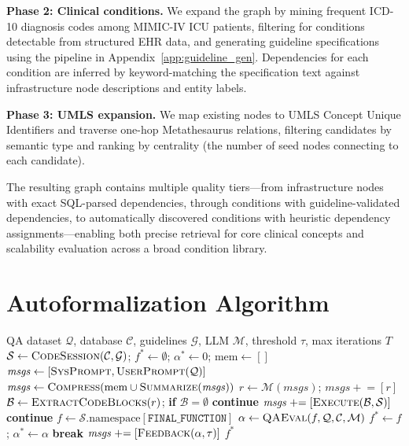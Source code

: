 \textbf{Phase 2: Clinical conditions.} We expand the graph by mining frequent ICD-10 diagnosis codes among MIMIC-IV ICU patients, filtering for conditions detectable from structured EHR data, and generating guideline specifications using the pipeline in Appendix~\ref{app:guideline_gen}. Dependencies for each condition are inferred by keyword-matching the specification text against infrastructure node descriptions and entity labels.

\textbf{Phase 3: UMLS expansion.} We map existing nodes to UMLS Concept Unique Identifiers and traverse one-hop Metathesaurus relations, filtering candidates by semantic type and ranking by centrality (the number of seed nodes connecting to each candidate).

The resulting graph contains multiple quality tiers—from infrastructure nodes with exact SQL-parsed dependencies, through conditions with guideline-validated dependencies, to automatically discovered conditions with heuristic dependency assignments—enabling both precise retrieval for core clinical concepts and scalability evaluation across a broad condition library.


\section{Autoformalization Algorithm}
\label{app:algorithm}

\begin{algorithm}[t]
\caption{Autoformalize}
\label{alg:autoformalize}
\begin{algorithmic}[1]
\Require QA dataset $\mathcal{Q}$, database $\mathcal{C}$, guidelines $\mathcal{G}$, LLM $\mathcal{M}$, threshold $\tau$, max iterations $T$
\State $\mathcal{S} \leftarrow \textsc{CodeSession}(\mathcal{C}, \mathcal{G})$; \;
       $f^* \leftarrow \emptyset$; \; $\alpha^* \leftarrow 0$; \; $\text{mem} \leftarrow []$
\State $\mathit{msgs} \leftarrow [\textsc{SysPrompt}, \textsc{UserPrompt}(\mathcal{Q})]$
        \State $\mathit{msgs} \leftarrow \textsc{Compress}(\text{mem} \cup \textsc{Summarize}(\mathit{msgs}))$
    \EndIf
    \State $r \leftarrow \mathcal{M}(\mathit{msgs})$; \; $\mathit{msgs} \mathrel{+}= [r]$
    \State $\mathcal{B} \leftarrow \textsc{ExtractCodeBlocks}(r)$; \; \textbf{if} $\mathcal{B}=\emptyset$ \textbf{continue}
    \State $\mathit{msgs} \mathrel{+}= [\textsc{Execute}(\mathcal{B}, \mathcal{S})]$
     \textbf{continue} \EndIf
    \State $f \leftarrow \mathcal{S}.\text{namespace}[\texttt{FINAL\_FUNCTION}]$
    \State $\alpha \leftarrow \textsc{QAEval}(f, \mathcal{Q}, \mathcal{C}, \mathcal{M})$
    \If{$\alpha > \alpha^*$} \; $f^* \leftarrow f$; \; $\alpha^* \leftarrow \alpha$ \EndIf
    \If{$\alpha \geq \tau$} \textbf{break} \EndIf
    \State $\mathit{msgs} \mathrel{+}= [\textsc{Feedback}(\alpha, \tau)]$
\EndFor
\State \Return $f^*$
\end{algorithmic}
\end{algorithm}

